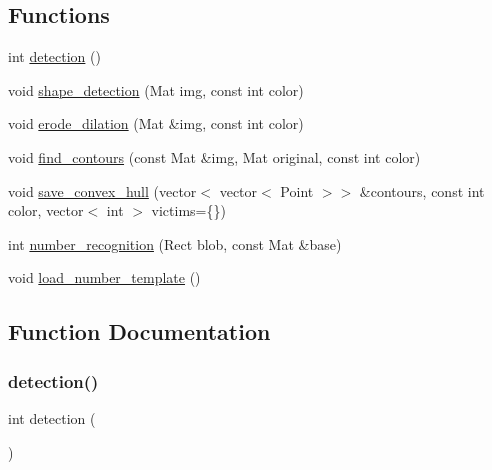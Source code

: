 \subsection*{Functions}
\begin{DoxyCompactItemize}
\item 
int \mbox{\hyperlink{detection_8hh_a17e13c447692201697b084a1906cf6fb}{detection}} ()
\item 
void \mbox{\hyperlink{detection_8hh_a8b32fd2b01b6598b1a04cc8b2e79d946}{shape\+\_\+detection}} (Mat img, const int color)
\item 
void \mbox{\hyperlink{detection_8hh_a28d0cdb56cfb2164f939dc2f83d1d9d0}{erode\+\_\+dilation}} (Mat \&img, const int color)
\item 
void \mbox{\hyperlink{detection_8hh_a93844a9ac3d8be0bd871bb41f8260330}{find\+\_\+contours}} (const Mat \&img, Mat original, const int color)
\item 
void \mbox{\hyperlink{detection_8hh_a89d5741c34b688433a779abe0bb21fa5}{save\+\_\+convex\+\_\+hull}} (vector$<$ vector$<$ Point $>$$>$ \&contours, const int color, vector$<$ int $>$ victims=\{\})
\item 
int \mbox{\hyperlink{detection_8hh_a785fcf35ca81d113a1ea3d831fbdbc22}{number\+\_\+recognition}} (Rect blob, const Mat \&base)
\item 
void \mbox{\hyperlink{detection_8hh_a50993b0aa4f01d89a4e5d0aef4e1e5f4}{load\+\_\+number\+\_\+template}} ()
\end{DoxyCompactItemize}


\subsection{Function Documentation}
\mbox{\label{detection_8hh_a17e13c447692201697b084a1906cf6fb}} 
\subsubsection{\texorpdfstring{detection()}{detection()}}
{\footnotesize\ttfamily int detection (\begin{DoxyParamCaption}{ }\end{DoxyParamCaption})}

\mbox{\label{detection_8hh_a28d0cdb56cfb2164f939dc2f83d1d9d0}} 
